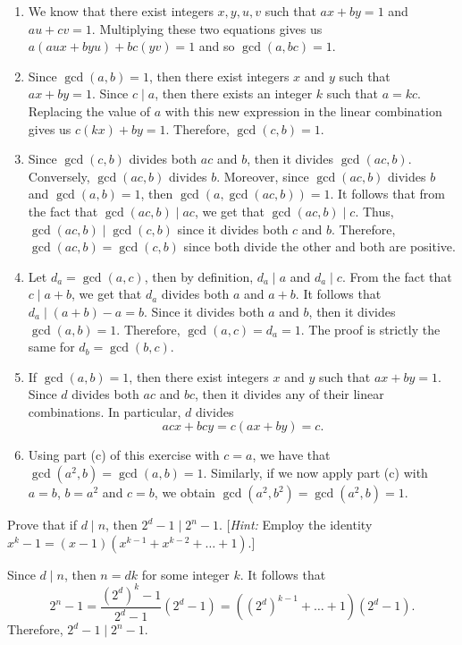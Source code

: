 \begin{solution}
    \begin{enumerate}
        \item We know that there exist integers $x,y,u,v$ such that $ax + by = 1$ and $au + cv = 1$. Multiplying these two equations gives us $a(aux + byu) + bc(yv) = 1$ and so $\gcd(a, bc) = 1$.
        \item Since $\gcd(a,b) = 1$, then there exist integers $x$ and $y$ such that $ax + by = 1$. Since $c \mid a$, then there exists an integer $k$ such that $a = kc$. Replacing the value of $a$ with this new expression in the linear combination gives us $c(kx) + by = 1$. Therefore, $\gcd(c, b) = 1$.
        \item Since $\gcd(c,b)$ divides both $ac$ and $b$, then it divides $\gcd(ac, b)$. Conversely, $\gcd(ac, b)$ divides $b$. Moreover, since $\gcd(ac, b)$ divides $b$ and $\gcd(a, b) = 1$, then $\gcd(a, \gcd(ac, b)) = 1$. It follows that from the fact that $\gcd(ac, b) \mid ac$, we get that $\gcd(ac, b) \mid c$. Thus, $\gcd(ac, b) \mid \gcd(c,b)$ since it divides both $c$ and $b$. Therefore, $\gcd(ac, b) = \gcd(c,b)$ since both divide the other and both are positive.
        \item Let $d_a = \gcd(a,c)$, then by definition, $d_a \mid a$ and $d_a \mid c$. From the fact that $c \mid a + b$, we get that $d_a$ divides both $a$ and $a+b$. It follows that $d_a \mid (a+b) - a = b$. Since it divides both $a$ and $b$, then it divides $\gcd(a,b) = 1$. Therefore, $\gcd(a,c) = d_a = 1$. The proof is strictly the same for $d_b = \gcd(b,c)$.
        \item If $\gcd(a,b) = 1$, then there exist integers $x$ and $y$ such that $ax+by = 1$. Since $d$ divides both $ac$ and $bc$, then it divides any of their linear combinations. In particular, $d$ divides
        $$acx + bcy = c(ax + by) = c.$$
        \item Using part (c) of this exercise with $c = a$, we have that $\gcd(a^2, b) = \gcd(a,b) = 1$. Similarly, if we now apply part (c) with $a = b$, $b = a^2$ and $c = b$, we obtain $\gcd(a^2, b^2) = \gcd(a^2, b) = 1$.
    \end{enumerate}
\end{solution}

\begin{exercise}
    Prove that if $d \mid n$, then $2^d - 1 \mid 2^n - 1$. [\textit{Hint:} Employ the identity $x^k - 1 = (x-1)(x^{k-1} + x^{k-2} + \dots + 1).$] \\
\end{exercise}

\begin{solution}
    Since $d \mid n$, then $n = dk$ for some integer $k$. It follows that
    $$2^n - 1 = \frac{(2^d)^k - 1}{2^d - 1}(2^d - 1) = ((2^d)^{k-1} + \dots + 1)(2^d - 1).$$
    Therefore, $2^d - 1 \mid 2^n - 1$.
\end{solution}